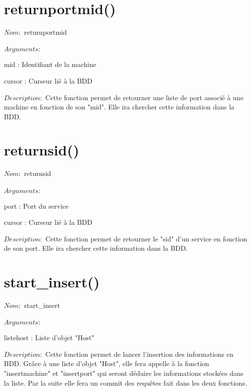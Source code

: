 \documentclass[12pt]{report}
\begin{document}
		\section{returnportmid()}
			{\setlength{\parindent}{0cm}
			$Nom :$ returnportmid\\\\
			}
			$Arguments :$
			\begin{description}
				\item mid : Identifiant de la machine
				\item cursor : Curseur lié à la BDD\\
			\end{description}
			$Description : $ Cette fonction permet de retourner une liste de port associé à une machine en fonction de son "mid". Elle ira chercher cette information dans la BDD.
		\section{returnsid()}
			{\setlength{\parindent}{0cm}
			$Nom :$ returnsid\\\\
			}
			$Arguments :$
			\begin{description}
				\item port : Port du service
				\item cursor : Curseur lié à la BDD\\
			\end{description}
			$Description : $ Cette fonction permet de retourner le "sid" d'un service en fonction de son port. Elle ira chercher cette information dans la BDD.
		\section{start\_insert()}
			{\setlength{\parindent}{0cm}
			$Nom :$ start\_insert\\\\
			}
			$Arguments :$
			\begin{description}
				\item listehost : Liste d'objet "Host"\\
			\end{description}
			$Description : $ Cette fonction permet de lancer l'insertion des informations en BDD. Grâce à une liste d'objet "Host", elle fera appelle à la fonction "insertmachine" et "insertport" qui seront déduire les informations stockées dans la liste. Par la suite elle fera un commit des requêtes fait dans les deux fonctions. 
\end{document}
